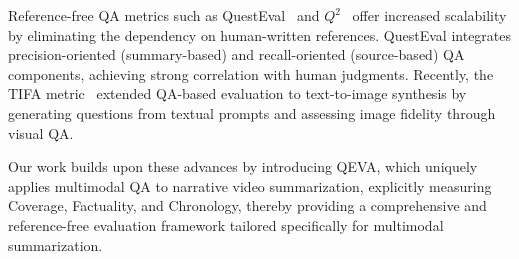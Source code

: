 Reference-free QA metrics such as QuestEval~\cite{scialom2021questeval} and $Q^2$~\cite{honovich2021q2evaluatingfactualconsistency} offer increased scalability by eliminating the dependency on human-written references. QuestEval integrates precision-oriented (summary-based) and recall-oriented (source-based) QA components, achieving strong correlation with human judgments. Recently, the TIFA metric~\cite{hu2023tifaaccurateinterpretabletexttoimage} extended QA-based evaluation to text-to-image synthesis by generating questions from textual prompts and assessing image fidelity through visual QA.

Our work builds upon these advances by introducing QEVA, which uniquely applies multimodal QA to narrative video summarization, explicitly measuring Coverage, Factuality, and Chronology, thereby providing a comprehensive and reference-free evaluation framework tailored specifically for multimodal summarization.

